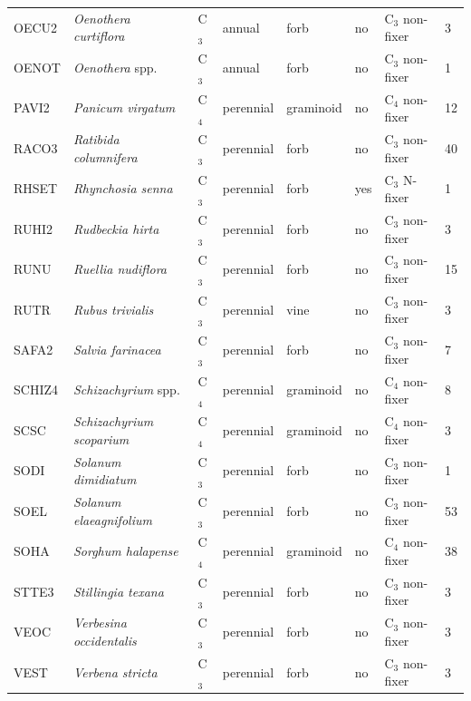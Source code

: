 \begin{landscape}
\begin{table}[]
{\begin{tabular}{p{2cm}p{5cm}p{2cm}p{2cm}p{2cm}p{2cm}p{3.5cm}p{2cm}}
        OECU2  & \textit{Oenothera curtiflora}      & C$_3$ & annual    & forb           & no  & C$_3$ non-fixer & 3  \\
        OENOT  & \textit{Oenothera} spp.            & C$_3$ & annual    & forb           & no  & C$_3$ non-fixer & 1  \\
        PAVI2  & \textit{Panicum virgatum}          & C$_4$ & perennial & graminoid      & no  & C$_4$ non-fixer & 12 \\
        RACO3  & \textit{Ratibida columnifera}      & C$_3$ & perennial & forb           & no  & C$_3$ non-fixer & 40 \\
        RHSET  & \textit{Rhynchosia senna}          & C$_3$ & perennial & forb           & yes & C$_3$ N-fixer    & 1  \\
        RUHI2  & \textit{Rudbeckia hirta}           & C$_3$ & perennial & forb           & no  & C$_3$ non-fixer & 3  \\
        RUNU   & \textit{Ruellia nudiflora}         & C$_3$ & perennial & forb           & no  & C$_3$ non-fixer & 15 \\
        RUTR   & \textit{Rubus trivialis}           & C$_3$ & perennial & vine           & no  & C$_3$ non-fixer & 3  \\
        SAFA2  & \textit{Salvia farinacea}          & C$_3$ & perennial & forb           & no  & C$_3$ non-fixer & 7  \\
        SCHIZ4 & \textit{Schizachyrium} spp.        & C$_4$ & perennial & graminoid      & no  & C$_4$ non-fixer & 8  \\
        SCSC   & \textit{Schizachyrium scoparium}   & C$_4$ & perennial & graminoid      & no  & C$_4$ non-fixer & 3  \\
        SODI   & \textit{Solanum dimidiatum}        & C$_3$ & perennial & forb           & no  & C$_3$ non-fixer & 1  \\
        SOEL   & \textit{Solanum elaeagnifolium}    & C$_3$ & perennial & forb           & no  & C$_3$ non-fixer & 53 \\
        SOHA   & \textit{Sorghum halapense}         & C$_4$ & perennial & graminoid      & no  & C$_4$ non-fixer & 38 \\
        STTE3  & \textit{Stillingia texana}         & C$_3$ & perennial & forb           & no  & C$_3$ non-fixer & 3  \\
        VEOC   & \textit{Verbesina occidentalis}    & C$_3$ & perennial & forb           & no  & C$_3$ non-fixer & 3  \\
        VEST   & \textit{Verbena stricta}           & C$_3$ & perennial & forb           & no  & C$_3$ non-fixer & 3  \\
        \hline
    \end{tabular}}
\end{table}
\end{landscape}
\clearpage


